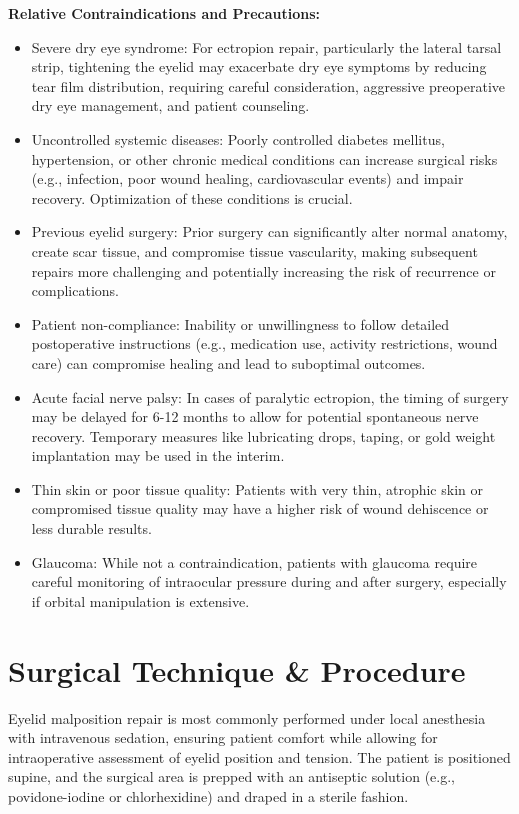 \textbf{Relative Contraindications and Precautions:}
\begin{itemize}
  \item Severe dry eye syndrome: For ectropion repair, particularly the lateral tarsal strip, tightening the eyelid may exacerbate dry eye symptoms by reducing tear film distribution, requiring careful consideration, aggressive preoperative dry eye management, and patient counseling.

  \item Uncontrolled systemic diseases: Poorly controlled diabetes mellitus, hypertension, or other chronic medical conditions can increase surgical risks (e.g., infection, poor wound healing, cardiovascular events) and impair recovery. Optimization of these conditions is crucial.

  \item Previous eyelid surgery: Prior surgery can significantly alter normal anatomy, create scar tissue, and compromise tissue vascularity, making subsequent repairs more challenging and potentially increasing the risk of recurrence or complications.

  \item Patient non-compliance: Inability or unwillingness to follow detailed postoperative instructions (e.g., medication use, activity restrictions, wound care) can compromise healing and lead to suboptimal outcomes.

  \item Acute facial nerve palsy: In cases of paralytic ectropion, the timing of surgery may be delayed for 6-12 months to allow for potential spontaneous nerve recovery. Temporary measures like lubricating drops, taping, or gold weight implantation may be used in the interim.

  \item Thin skin or poor tissue quality: Patients with very thin, atrophic skin or compromised tissue quality may have a higher risk of wound dehiscence or less durable results.

  \item Glaucoma: While not a contraindication, patients with glaucoma require careful monitoring of intraocular pressure during and after surgery, especially if orbital manipulation is extensive.
\end{itemize}

\section*{Surgical Technique \& Procedure}
Eyelid malposition repair is most commonly performed under local anesthesia with intravenous sedation, ensuring patient comfort while allowing for intraoperative assessment of eyelid position and tension. The patient is positioned supine, and the surgical area is prepped with an antiseptic solution (e.g., povidone-iodine or chlorhexidine) and draped in a sterile fashion.

